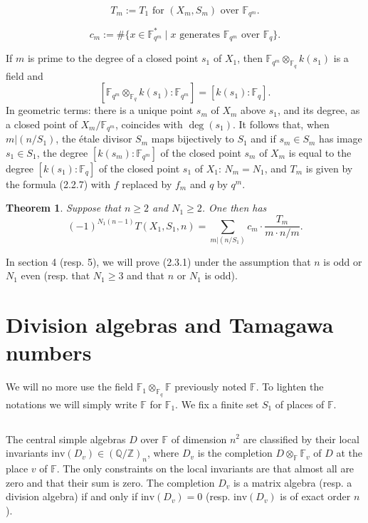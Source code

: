 \documentclass[11pt,a4paper]{article}
\theoremstyle{plain}
\newtheorem{theorem}{Theorem}[section]
\theoremstyle{definition}
\newcommand{\Fq}{\mathbb{F}_q}
\newcommand{\F}{\mathbb{F}}
\newcommand{\Z}{\mathbb{Z}}
\newcommand{\Q}{\mathbb{Q}}
\begin{document}
\begin{equation}
T_m := T_1 \text{ for } (X_m, S_m) \text{ over } \F_{q^m}. \tag{2.2.8}
\end{equation}

\begin{equation}
c_m := \# \{ x \in \F_{q^m}^* \mid x \text{ generates } \F_{q^m} \text{ over } \Fq \}. \tag{2.2.9}
\end{equation}

If $m$ is prime to the degree of a closed point $s_1$ of $X_1$, then $\F_{q^m} \otimes_{\Fq} k(s_1)$ is a field and
\[
[\F_{q^m} \otimes_{\Fq} k(s_1) : \F_{q^m}] = [k(s_1) : \Fq].
\]
In geometric terms: there is a unique point $s_m$ of $X_m$ above $s_1$, and its degree, as a closed point of $X_m/\F_{q^m}$, coincides with $\deg(s_1)$. It follows that, when $m | (n/S_1)$, the \'etale divisor $S_m$ maps bijectively to $S_1$ and if $s_m \in S_m$ has image $s_1 \in S_1$, the degree $[k(s_m): \F_{q^m}]$ of the closed point $s_m$ of $X_m$ is equal to the degree $[k(s_1): \Fq]$ of the closed point $s_1$ of $X_1$: $N_m = N_1$, and $T_m$ is given by the formula (2.2.7) with $f$ replaced by $f_m$ and $q$ by $q^m$.

\begin{theorem}\label{thm:firstform}
Suppose that $n \geq 2$ and $N_1 \geq 2$. One then has
\begin{equation}
(-1)^{N_1(n-1)} T(X_1,S_1,n) = \sum_{m | (n/S_1)} c_m \cdot \frac{T_m}{m \cdot n/m}. \tag{2.3.1}
\end{equation}
\end{theorem}

In section 4 (resp. 5), we will prove (2.3.1) under the assumption that $n$ is odd or $N_1$ even (resp. that $N_1 \geq 3$ and that $n$ or $N_1$ is odd).

\section{Division algebras and Tamagawa numbers}

We will no more use the field $\mathbb{F}_1 \otimes_{\Fq} \F$ previously noted $\mathbb{F}$. To lighten the notations we will simply write $\mathbb{F}$ for $\mathbb{F}_1$. We fix a finite set $S_1$ of places of $\mathbb{F}$.

\subsection{}
The central simple algebras $D$ over $\mathbb{F}$ of dimension $n^2$ are classified by their local invariants $\mathrm{inv}(D_v) \in (\Q/\Z)_n$, where $D_v$ is the completion $D \otimes_{\mathbb{F}} \mathbb{F}_v$ of $D$ at the place $v$ of $\mathbb{F}$. The only constraints on the local invariants are that almost all are zero and that their sum is zero. The completion $D_v$ is a matrix algebra (resp. a division algebra) if and only if $\mathrm{inv}(D_v) = 0$ (resp. $\mathrm{inv}(D_v)$ is of exact order $n$).
\end{document}
